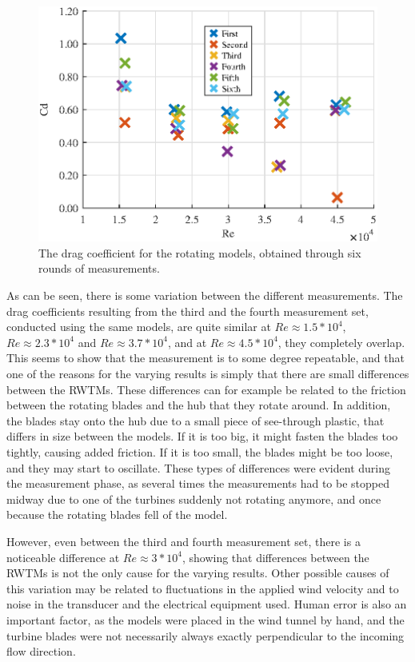 \begin{figure}
    \centering
    \includegraphics[width=\linewidth]{0_Images/RotationalCDRe.eps}
    \caption{The drag coefficient for the rotating models, obtained through six rounds of measurements.}
    \label{fig:RotationalCD}
\end{figure}

As can be seen, there is some variation between the different measurements. The drag coefficients resulting from the third and the fourth measurement set, conducted using the same models, are quite similar at $Re \approx 1.5*10^4$, $Re \approx 2.3*10^4$ and $Re \approx 3.7*10^4$, and at $Re \approx 4.5*10^4$, they completely overlap. This seems to show that the measurement is to some degree repeatable, and that one of the reasons for the varying results is simply that there are small differences between the \gls{RWTM}s. These differences can for example be related to the friction between the rotating blades and the hub that they rotate around. In addition, the blades stay onto the hub due to a small piece of see-through plastic, that differs in size between the models. If it is too big, it might fasten the blades too tightly, causing added friction. If it is too small, the blades might be too loose, and they may start to oscillate. These types of differences were evident during the measurement phase, as several times the measurements had to be stopped midway due to one of the turbines suddenly not rotating anymore, and once because the rotating blades fell of the model.  

However, even between the third and fourth measurement set, there is a noticeable difference at $Re \approx 3*10^4$, showing that differences between the \gls{RWTM}s is not the only cause for the varying results. Other possible causes of this variation may be related to fluctuations in the applied wind velocity and to noise in the transducer and the electrical equipment used. Human error is also an important factor, as the models were placed in the wind tunnel by hand, and the turbine blades were not necessarily always exactly perpendicular to the incoming flow direction.   

